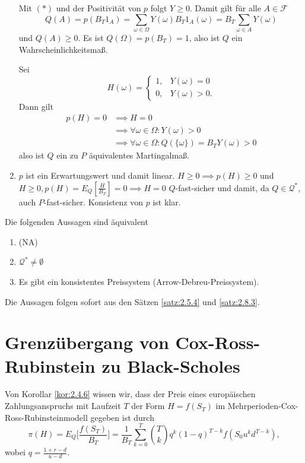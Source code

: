\documentclass[a4paper,twoside,DIV15,BCOR12mm]{scrbook}
\newcommand{\cF}{\mathcal F}
\newcommand{\cQ}{\mathcal Q}
\begin{document}
\begin{beweis}
\begin{enumerate}
Mit $(*)$  und der Positivität von $p$ folgt $Y\ge 0$. Damit gilt für alle $A\in \cF$
\[
Q(A) = p(B_T1_A)
= \sum_{\omega\in\Omega} Y(\omega) B_T 1_A(\omega)
=  B_T \sum_{\omega\in A} Y(\omega)
\]
und $Q(A) \ge 0$. Es ist $Q(\Omega)=p(B_T) = 1$, also ist $Q$ ein Wahrscheinlichkeitsmaß.

Sei 
\[
H(\omega)=
\begin{cases}
1, & Y(\omega) =0\\
0, & Y(\omega) >0.
\end{cases}\]
Dann gilt
\begin{align*}
p(H) = 0 &\implies  H= 0\\
&\implies \forall \omega \in \Omega: Y(\omega) >0 \\
&\implies \forall \omega \in \Omega: Q(\{\omega\}) = B_TY(\omega) >0 
\end{align*}
also ist $Q$ ein zu $P$ äquivalentes Martingalmaß.
\item $p$ ist ein Erwartungswert und damit linear. $H\ge 0 \implies p(H)\ge 0$ und $H\ge 0, p(H) = E_Q[\frac{H}{B_T}] = 0 \implies H= 0$ $Q$-fast-sicher und damit, da $Q\in\cQ^*$, auch $P$-fast-sicher. Konsistenz von $p$ ist klar.
\end{enumerate}
\end{beweis}

\begin{satz}
Die folgenden Aussagen sind äquivalent
\begin{enumerate}
\item (NA)
\item $\cQ^*\ne \emptyset$
\item Es gibt ein konsistentes Preissystem (Arrow-Debreu-Preissystem).
\end{enumerate}
\end{satz}

\begin{beweis}
Die Aussagen folgen sofort aus den Sätzen \ref{satz:2.5.4} und \ref{satz:2.8.3}.
\end{beweis}

\section{Grenzübergang von Cox-Ross-Rubinstein zu Black-Scholes}

Von Korollar \ref{kor:2.4.6} wissen wir, dass der Preis eines europäischen Zahlungsanspruchs mit Laufzeit $T$ der Form $H=f(S_T)$ im Mehrperioden-Cox-Ross-Rubinsteinmodell gegeben ist durch
\[
\pi(H) = E_Q\bigg[\frac{f(S_T)}{B_T}\bigg] = \frac1{B_T} \sum_{k=0}^T \binom T k q^k(1-q)^{T-k} f(S_0 u^k d^{T-k}),
\]
wobei $q=\frac{1+r-d}{u-d}$.
\end{document}
